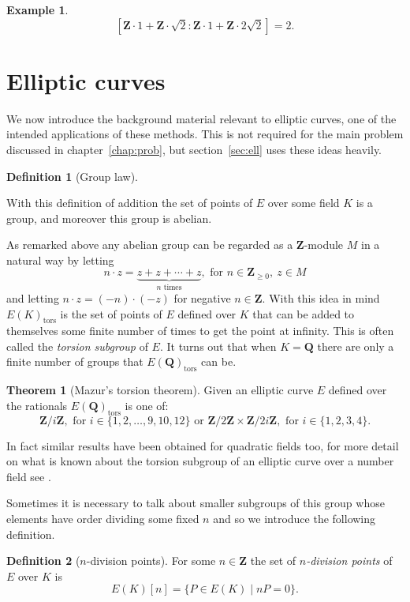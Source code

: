 \documentclass[a4paper,abstracton]{scrreprt}
\theoremstyle{definition}
\newtheorem{thm}{Theorem}
\newtheorem{defn}{Definition}
\newtheorem{ex}{Example}
\newcommand{\QQ}{\mathbf{Q}}
\newcommand{\ZZ}{\mathbf{Z}}
\begin{document}
\begin{ex}
\[[\ZZ\cdot 1 + \ZZ\cdot \sqrt{2} \colon \ZZ \cdot 1 + \ZZ \cdot 2\sqrt{2}] = 2.\]
\end{ex}

\section{Elliptic curves}
We now introduce the background material relevant to elliptic curves, one of the intended applications of these methods.
This is not required for the main problem discussed in chapter~\ref{chap:prob}, but section~\ref{sec:ell} uses these ideas heavily.

\begin{defn}[Group law]
\end{defn}
With this definition of addition the set of points of $E$ over some field $K$ is a group, and moreover this group is abelian.

As remarked above any abelian group can be regarded as a $\ZZ$-module $M$ in a natural way by letting 
\[n\cdot z = \underbrace{z + z + \cdots + z}_\text{$n$ times},\text{ for } n\in\ZZ_{\ge 0},\ z\in M\]
and letting $n\cdot z = (-n)\cdot(-z)$ for negative $n\in \ZZ$.
With this idea in mind $E(K)_\text{tors}$ is the set of points of $E$ defined over $K$ that can be added to themselves some finite number of times to get the point at infinity.
This is often called the \emph{torsion subgroup} of $E$.
It turns out that when $K = \QQ$ there are only a finite number of groups that $E(\QQ)_\text{tors}$ can be.

\begin{thm}[Mazur's torsion theorem]
\label{thm:tors}
Given an elliptic curve $E$ defined over the rationals $E(\QQ)_\text{tors}$ is one of:
\[
\ZZ/i\ZZ,\text{ for } i \in\{1,2,\ldots,9,10,12\}\text{ or }
\ZZ/2\ZZ \times \ZZ/2i\ZZ,\text{ for } i \in\{1,2,3,4\}.
\]
\end{thm}

In fact similar results have been obtained for quadratic fields too, for more detail on what is known about the torsion subgroup of an elliptic curve over a number field see \cite{sutherland}.

Sometimes it is necessary to talk about smaller subgroups of this group whose elements have order dividing some fixed $n$ and so we introduce the following definition.
\begin{defn}[$n$-division points]
For some $n\in\ZZ$ the set of \emph{$n$-division points} of $E$ over $K$ is
\[
E(K)[n] = \{P\in E(K) \mid nP = 0\}.
\]
\end{defn}
\end{document}
